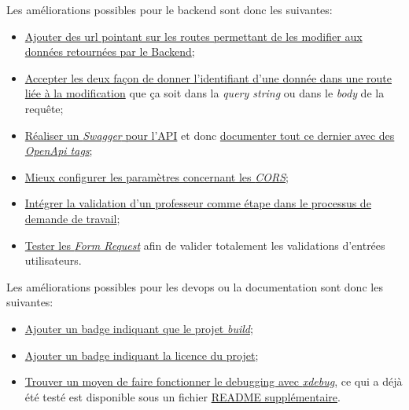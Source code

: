 \documentclass[
    iai, %
    il, %
]{heig-tb}
\begin{document}
Les améliorations possibles pour le \Gls{backend} sont donc les suivantes:
\begin{itemize}
    \item \href{https://github.com/heig-fablab/fablab-manager/issues/41}{Ajouter des url pointant sur les routes permettant de les modifier aux données retournées par le Backend};
    \item \href{https://github.com/heig-fablab/fablab-manager/issues/100}{Accepter les deux façon de donner l'identifiant d'une donnée dans une route liée à la modification} que ça soit dans la \emph{query string} ou dans le \emph{body} de la requête;
    \item \href{https://github.com/heig-fablab/fablab-manager/issues/22}{Réaliser un \emph{Swagger} pour l'API} et donc \href{https://github.com/heig-fablab/fablab-manager/issues/45}{documenter tout ce dernier avec des \emph{OpenApi tags}};
    \item \href{https://github.com/heig-fablab/fablab-manager/issues/83}{Mieux configurer les paramètres concernant les \emph{CORS}};
    \item \href{https://github.com/heig-fablab/fablab-manager/issues/89}{Intégrer la validation d'un professeur comme étape dans le processus de demande de travail};
    \item \href{https://github.com/heig-fablab/fablab-manager/issues/93}{Tester les \emph{Form Request}} afin de valider totalement les validations d'entrées utilisateurs.
\end{itemize}

Les améliorations possibles pour les \Gls{devops} ou la documentation sont donc les suivantes:
\begin{itemize}
    \item \href{https://github.com/heig-fablab/fablab-manager/issues/126}{Ajouter un badge indiquant que le projet \emph{build}};
    \item \href{https://github.com/heig-fablab/fablab-manager/issues/127}{Ajouter un badge indiquant la licence du projet};
    \item \href{https://github.com/heig-fablab/fablab-manager/issues/134}{Trouver un moyen de faire fonctionner le debugging avec \emph{xdebug}}, ce qui a déjà été testé est disponible sous un fichier \href{https://github.com/heig-fablab/fablab-manager/blob/main/README-coverage-debug-part.md}{README supplémentaire}.
\end{itemize}
\end{document}
